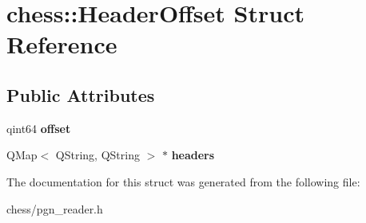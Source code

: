 \hypertarget{structchess_1_1HeaderOffset}{\section{chess\-:\-:Header\-Offset Struct Reference}
\label{structchess_1_1HeaderOffset}
}
\subsection*{Public Attributes}
\begin{DoxyCompactItemize}
\item 
\hypertarget{structchess_1_1HeaderOffset_a928ca5d404a212dcb18239fbfd218300}{qint64 {\bfseries offset}}\label{structchess_1_1HeaderOffset_a928ca5d404a212dcb18239fbfd218300}

\item 
\hypertarget{structchess_1_1HeaderOffset_a883faef02518fdb91b47662ab0fb4fd6}{Q\-Map$<$ Q\-String, Q\-String $>$ $\ast$ {\bfseries headers}}\label{structchess_1_1HeaderOffset_a883faef02518fdb91b47662ab0fb4fd6}

\end{DoxyCompactItemize}


The documentation for this struct was generated from the following file\-:\begin{DoxyCompactItemize}
\item 
chess/pgn\-\_\-reader.\-h\end{DoxyCompactItemize}
